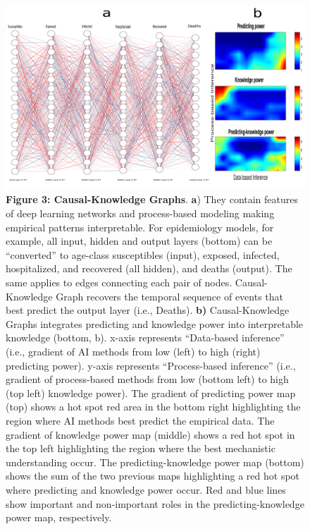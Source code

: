 \documentclass[11pt, a4paper]{article} %
\begin{document}
 \begin{figure}[h!]
   \includegraphics[width=1\textwidth]{Figures/Figure3integrated.pdf}
   {\small {\bf Figure 3: Causal-Knowledge Graphs}. {\bf a}) They
     contain features of deep learning networks and process-based
     modeling making empirical patterns interpretable. For
     epidemiology models, for example, all input, hidden and output
     layers (bottom) can be ``converted'' to age-class susceptibles
     (input), exposed, infected, hospitalized, and recovered (all
     hidden), and deaths (output). The same applies to edges
     connecting each pair of nodes. Causal-Knowledge Graph recovers
     the temporal sequence of events that best predict the output
     layer (i.e., Deaths). {\bf b)} Causal-Knowledge Graphs integrates
     predicting and knowledge power into interpretable knowledge
     (bottom, b). x-axis represents ``Data-based inference'' (i.e.,
     gradient of AI methods from low (left) to high (right) predicting
     power). y-axis represents ``Process-based inference'' (i.e.,
     gradient of process-based methods from low (bottom left) to high
     (top left) knowledge power). The gradient of predicting power map
     (top) shows a hot spot red area in the bottom right highlighting
     the region where AI methods best predict the empirical data. The
     gradient of knowledge power map (middle) shows a red hot spot in
     the top left highlighting the region where the best mechanistic
     understanding occur. The predicting-knowledge power map (bottom)
     shows the sum of the two previous maps highlighting a red hot
     spot where predicting and knowledge power occur. Red and blue
     lines show important and non-important roles in the
     predicting-knowledge power map, respectively.}
\end{figure}
  
\end{document}
